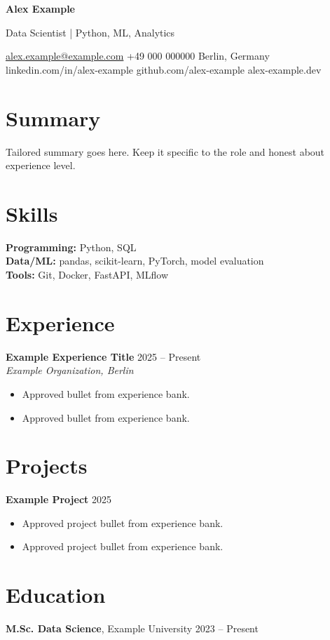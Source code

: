 \documentclass[a4paper,10pt]{article}
\makeatletter
\newcommand{\UserName}{Alex Example}
\newcommand{\UserHeadline}{Data Scientist | Python, ML, Analytics}
\newcommand{\UserEmail}{alex.example@example.com}
\newcommand{\UserPhone}{+49 000 000000}
\newcommand{\UserLocation}{Berlin, Germany}
\newcommand{\UserLinkedIn}{linkedin.com/in/alex-example}
\newcommand{\UserGitHub}{github.com/alex-example}
\newcommand{\UserPortfolio}{alex-example.dev}
\makeatother
\begin{document}
{\Huge\bfseries\color{accent}\UserName}

\vspace{3pt}
{\large\UserHeadline}

\vspace{5pt}
\href{mailto:\UserEmail}{\UserEmail} \textbullet{} \UserPhone \textbullet{} \UserLocation\\
\UserLinkedIn \textbullet{} \UserGitHub \textbullet{} \UserPortfolio

\vspace{6pt}
\noindent{\color{accent}\rule{\linewidth}{1pt}}

\section*{Summary}
Tailored summary goes here. Keep it specific to the role and honest about experience level.

\section*{Skills}
\textbf{Programming:} Python, SQL\\
\textbf{Data/ML:} pandas, scikit-learn, PyTorch, model evaluation\\
\textbf{Tools:} Git, Docker, FastAPI, MLflow

\section*{Experience}
\textbf{Example Experience Title} \hfill 2025 -- Present\\
\textit{Example Organization, Berlin}
\begin{itemize}
  \item Approved bullet from experience bank.
  \item Approved bullet from experience bank.
\end{itemize}

\section*{Projects}
\textbf{Example Project} \hfill 2025\\
\begin{itemize}
  \item Approved project bullet from experience bank.
  \item Approved project bullet from experience bank.
\end{itemize}

\section*{Education}
\textbf{M.Sc. Data Science}, Example University \hfill 2023 -- Present
\end{document}
